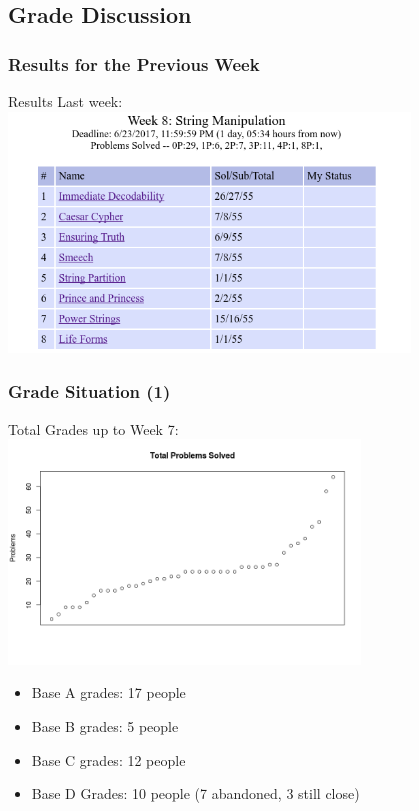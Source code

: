 \subsection{Grade Discussion}

\begin{frame}
  \frametitle{Results for the Previous Week}

  \begin{center}

    Results Last week:
    \includegraphics[width=0.8\textwidth]{img/resultsW8}

  \end{center}
\end{frame}


\begin{frame}
  \frametitle{Grade Situation (1)}
  \begin{center}
    Total Grades up to Week 7:
    \includegraphics[width=0.7\textwidth]{img/totalproblemsW7}
    
    \medskip

    \begin{itemize}
    \item Base A grades: 17 people
    \item Base B grades: 5 people
    \item Base C grades: 12 people
    \item Base D Grades: 10 people (7 abandoned, 3 still close)
    \end{itemize}
  \end{center}
\end{frame}

